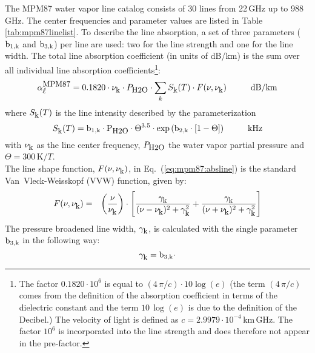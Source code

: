 {
\label{levele:mpm87_h2olines}
The MPM87 \cite{liebeandlayton:87} water vapor line catalog consists 
of 30 lines from 22\,GHz up to 988\,GHz. The center frequencies and parameter 
values are listed in Table \ref{tab:mpm87linelist}. To describe the line 
absorption, a set of three parameters ($\rm b_{\rm 1,k}$ and $\rm b_{\rm 3,k}$) per line are used: two 
for the line strength and one for the line width. The total line 
absorption coefficient (in units of dB/km) is the sum over all 
individual line absorption coefficients\footnote{The factor 
  $0.1820 \cdot 10^{6}$ is equal to $(4\,\pi/c)\cdot 10\log{(e)}$
  (the term $(4\,\pi/c)$ comes from the definition of the absorption
  coefficient in terms of the dielectric constant and the term 
  $10\,\log{(e)}$ is due to the definition of the Decibel.) The
  velocity of light is defined as $c=2.9979\cdot 10^{-4}$\,km\,GHz. 
  The factor $10^{6}$ is incorporated into the line strength and 
  does therefore not appear in the pre-factor.}:
\begin{equation}
  \label{eq:mpm87:absline}
  \alphampmol = 0.1820 \cdot \nuk \cdot \phzo \cdot 
  \sum_{k}{\inten \cdot \shape}\hspace*{10mm}\mbox{dB/km}
\end{equation}
where $S_{\mbox{\rm \small k}}(T)$ is the line intensity described by the parameterization
\begin{equation}
  \label{eq:mpm87:strength}
  \inten = \bek \cdot \phzo \cdot \Theta^{3.5} 
           \cdot \exp{(\bzk \cdot [1-\Theta])}\hspace*{10mm}\mbox{kHz}
\end{equation}
with $\nu_{\mbox{\rm \small k}}$ as the line center frequency, $P_{\mbox{\rm \small H2O}}$ the water
vapor partial pressure and $\Theta = 300\,\mbox{K}/T$.\\
The line shape function, $F(\nu,\nu_{\mbox{\rm \small k}})$, in Eq.~(\ref{eq:mpm87:absline}) 
is the standard Van~Vleck-Weisskopf (VVW) function, given by:
\begin{eqnarray}
  \label{eq:mpm87:VVW}
  F(\nu,\nu_{\mbox{\rm \small k}}) & = & \left(\frac{\nu}{\nu_{\mbox{\rm \small k}}}\right) \cdot 
               \left[\frac{\gamma_{\mbox{\rm \small k}}}{(\nu - \nu_{\mbox{\rm \small k}})^2 + \gamma_{\mbox{\rm \small k}}^2} + 
                     \frac{\gamma_{\mbox{\rm \small k}}}{(\nu + \nu_{\mbox{\rm \small k}})^2 + \gamma_{\mbox{\rm \small k}}^2}\right]\\
\end{eqnarray}
The pressure broadened line width, $\gamma_{\mbox{\rm \small k}}$, is calculated with the 
single parameter $\rm b_{\rm 3,k}$ in the following way:
\begin{equation}
  \label{eq:mpm87:gamma}
  \gamk = \bdk \cdot 

\end{equation}}
